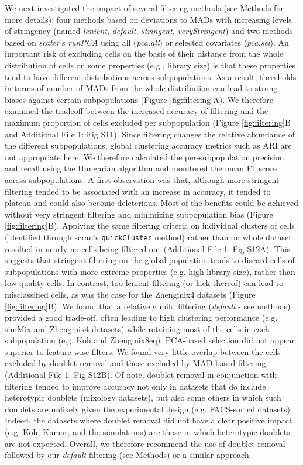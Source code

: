 \documentclass{bmcart}
\begin{document}
We next investigated the impact of several filtering methods (see Methods for more details): four methods based on deviations to MADs with increasing levels of stringency (named \textit{lenient}, \textit{default}, \textit{stringent}, \textit{veryStringent}) and two methods based on \textit{scater}'s \textit{runPCA} using all (\textit{pca.all}) or selected covariates (\textit{pca.sel}). An important risk of excluding cells on the basis of their distance from the whole distribution of cells on some properties (e.g., library size) is that these properties tend to have different distributions across subpopulations. As a result, thresholds in terms of number of MADs from the whole distribution can lead to strong biases against certain subpopulations (Figure \ref{fig:filtering}A). We therefore examined the tradeoff between the increased accuracy of filtering and the maximum proportion of cells excluded per subpopulation (Figure \ref{fig:filtering}B and Additional File 1: Fig S11). Since filtering changes the relative abundance of the different subpopulations, global clustering accuracy metrics such as ARI are not appropriate here. We therefore calculated the per-subpopulation precision and recall using the Hungarian algorithm \cite{kuhnHungarianMethod1955} and monitored the mean F1 score across subpopulations. A first observation was that, although more stringent filtering tended to be associated with an increase in accuracy, it tended to plateau and could also become deleterious. Most of the benefits could be achieved without very stringent filtering and minimizing subpopulation bias (Figure \ref{fig:filtering}B). Applying the same filtering criteria on individual clusters of cells (identified through scran's \texttt{quickCluster} method) rather than on whole dataset resulted in nearly no cells being filtered out (Additional File 1: Fig S12A). This suggests that stringent filtering on the global population tends to discard cells of subpopulations with more extreme properties (e.g. high library size), rather than low-quality cells. In contrast, too lenient filtering (or lack thereof) can lead to misclassified cells, as was the case for the Zhengmix4 datasets (Figure \ref{fig:filtering}B). We found that a relatively mild filtering (\textit{default} - see methods) provided a good trade-off, often leading to high clustering performance (e.g. simMix and Zhengmix4 datasets) while retaining most of the cells in each subpopulation (e.g. Koh and Zhengmix8eq). PCA-based selection did not appear superior to feature-wise filters. We found very little overlap between the cells excluded by doublet removal and those excluded by MAD-based filtering (Additional File 1: Fig S12B). Of note, doublet removal in conjunction with filtering tended to improve accuracy not only in datasets that do include heterotypic doublets (mixology datasets), but also some others in which such doublets are unlikely given the experimental design (e.g. FACS-sorted datasets). Indeed, the datasets where doublet removal did not have a clear positive impact (e.g. Koh, Kumar, and the simulations) are those in which heterotypic doublets are not expected. Overall, we therefore recommend the use of doublet removal followed by our \textit{default} filtering (see Methods) or a similar approach.
\end{document}
